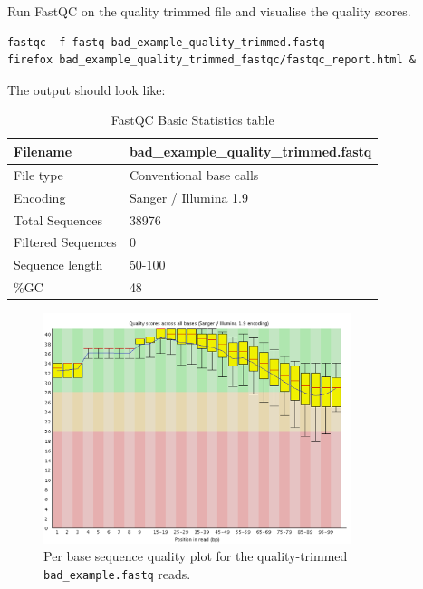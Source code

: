 \begin{steps}
Run FastQC on the quality trimmed file and visualise the quality scores.

\begin{lstlisting}
fastqc -f fastq bad_example_quality_trimmed.fastq
firefox bad_example_quality_trimmed_fastqc/fastqc_report.html &
\end{lstlisting}

The output should look like:

\begin{table}[H]
  \centering
  \caption{FastQC Basic Statistics table}
    \begin{tabular}{ll}
    \toprule
    Filename & bad\_example\_quality\_trimmed.fastq\\
    \midrule
    File type & Conventional base calls\\
    Encoding & Sanger / Illumina 1.9\\
    Total Sequences & 38976\\
    Filtered Sequences & 0\\
    Sequence length & 50-100\\
    \%GC & 48\\
    \bottomrule
    \end{tabular}
  \label{tab:badexamplequalitytrimmed}
\end{table}

\begin{figure}[H]
\centering
\includegraphics[width=0.8\textwidth]{ngs-qc/bad_example_quality_trimmed.png}
\caption{Per base sequence quality plot for the quality-trimmed \texttt{bad\_example.fastq} reads.}
\label{fig:bad_example_quality_trimmed_plot}
\end{figure}

\end{steps}

